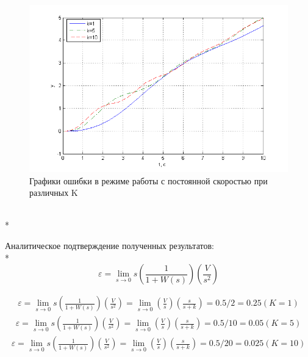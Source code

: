 \documentclass[a4paper, 12pt]{article}
\begin{document}
\begin{figure}[H]
	\centering
	\includegraphics[width = 1\textwidth]{hinh7}
	\caption{Графики ошибки в режиме работы с постоянной скоростью при различных K}
\end{figure}\hfill\\*

Аналитическое подтверждение полученных результатов:\\*
\begin{equation}
\varepsilon=\lim_{s \to 0} s(\frac{1}{1+W(s)})(\frac{V}{s^2})
\end{equation}

\begin{align}
\varepsilon=\lim_{s \to 0} s(\frac{1}{1+W(s)})(\frac{V}{s^2})=\lim_{s \to 0} (\frac{V}{s})(\frac{s}{s+k})=0.5/2=0.25 (K=1) 
\end{align}
\begin{align}
\varepsilon=\lim_{s \to 0} s(\frac{1}{1+W(s)})(\frac{V}{s^2})=\lim_{s \to 0} (\frac{V}{s})(\frac{s}{s+k})=0.5/10=0.05(K=5) 
\end{align}
\begin{align}
\varepsilon=\lim_{s \to 0} s(\frac{1}{1+W(s)})(\frac{V}{s^2})=\lim_{s \to 0} (\frac{V}{s})(\frac{s}{s+k})=0.5/20=0.025(K=10)
\end{align}

\par
\end{document}
